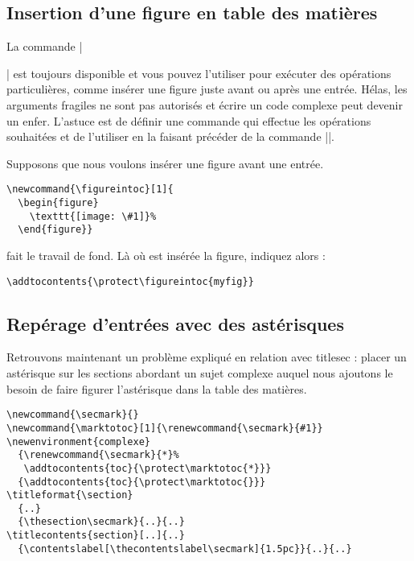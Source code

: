\documentclass[a4paper]{ltxguide}
\begin{document}
\subsection{Insertion d'une figure en table des matières}

La commande |\addtocontents| est toujours disponible et vous pouvez l'utiliser
pour exécuter des opérations particulières, comme insérer une figure juste
avant ou après une entrée. Hélas, les arguments fragiles ne sont pas autorisés
et écrire un code complexe peut devenir un enfer. L'astuce est de définir 
une commande qui effectue les opérations souhaitées et de l'utiliser en la
faisant précéder de la commande |\protect|.

Supposons que nous voulons insérer une figure avant une entrée.
\begin{verbatim}
\newcommand{\figureintoc}[1]{
  \begin{figure}
    \texttt{[image: \#1]}%
  \end{figure}}
\end{verbatim}
fait le travail de fond. Là où est insérée la figure, indiquez alors :
\begin{verbatim}
\addtocontents{\protect\figureintoc{myfig}}
\end{verbatim}


\subsection{Repérage d'entrées avec des astérisques}

Retrouvons maintenant un problème expliqué en relation avec \textsf{titlesec} :
placer un astérisque sur les sections abordant un \og sujet complexe \fg{}
auquel nous ajoutons le besoin de faire figurer l'astérisque dans la table des
matières.
\begin{verbatim}
\newcommand{\secmark}{}
\newcommand{\marktotoc}[1]{\renewcommand{\secmark}{#1}}
\newenvironment{complexe}
  {\renewcommand{\secmark}{*}%
   \addtocontents{toc}{\protect\marktotoc{*}}}
  {\addtocontents{toc}{\protect\marktotoc{}}}
\titleformat{\section}
  {..}
  {\thesection\secmark}{..}{..}
\titlecontents{section}[..]{..}
  {\contentslabel[\thecontentslabel\secmark]{1.5pc}}{..}{..}
\end{verbatim}
\end{document}
